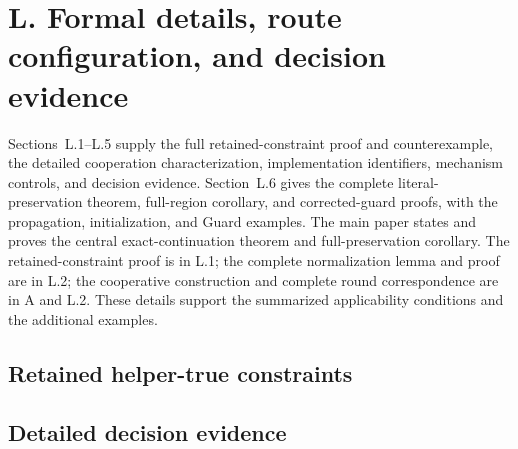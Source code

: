 \section*{L. Formal details, route configuration, and decision evidence}
Sections~L.1--L.5 supply the full retained-constraint proof and
counterexample, the detailed cooperation characterization, implementation
identifiers, mechanism controls, and decision evidence. Section~L.6 gives
the complete literal-preservation theorem, full-region corollary, and
corrected-guard proofs, with the propagation, initialization, and Guard
examples. The main paper states and proves the central exact-continuation theorem
and full-preservation corollary. The retained-constraint proof is in L.1;
the complete normalization lemma and proof are in L.2;
the cooperative construction and complete round correspondence are in
A and L.2. These details support the summarized applicability conditions
and the additional examples.
\setcounter{subsection}{0}
\renewcommand{\thesubsection}{L.\arabic{subsection}}
\renewcommand{\theHsubsection}{L.\arabic{subsection}}
\setcounter{theorem}{0}
\renewcommand{\thetheorem}{L.\arabic{theorem}}
\renewcommand{\theHtheorem}{L.\arabic{theorem}}
\setcounter{lemma}{0}
\renewcommand{\thelemma}{L.\arabic{lemma}}
\renewcommand{\theHlemma}{L.\arabic{lemma}}
\setcounter{equation}{0}
\renewcommand{\theequation}{L.\arabic{equation}}
\renewcommand{\theHequation}{L.\arabic{equation}}
\subsection{Retained helper-true constraints}\label{sec:formal}



\clearpage
\subsection{Detailed decision evidence}

\clearpage

